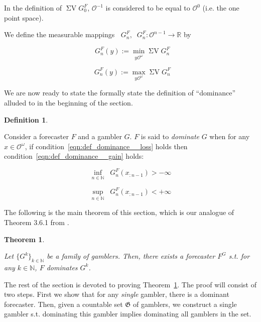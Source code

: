 \documentclass[11pt]{article}
\theoremstyle{definition}
\newtheorem{definition}{Definition}%
\theoremstyle{plain}
\newtheorem{theorem}{Theorem}%
\newcommand{\Nats}{\mathbb{N}}
\newcommand{\Reals}{\mathbb{R}}
\newcommand{\Sq}[2]{\{#1\}_{#2 \in \Nats}}
\newcommand{\Ob}{\mathcal{O}}
\newcommand{\OO}{\Ob^\omega}
\newcommand{\GC}{\mathfrak{G}}
\DeclareMathOperator{\SV}{\Sigma V}
\DeclareMathOperator{\SVM}{\Sigma V_{\min}}
\DeclareMathOperator{\SVX}{\Sigma V_{\max}}
\begin{document}
In the definition of $\SV G^F_0$, $\Ob^{-1}$ is considered to be equal to $\Ob^0$ (i.e. the one point space).

We define the measurable mappings $\SVM G^F_n, \SVX G^F_n: \Ob^{n-1} \rightarrow \Reals$ by

\begin{equation}
\SVM G^F_n\left(y\right):=\min_{y\OO} \SV G^F_n
\end{equation}

\begin{equation}
\SVX G^F_n\left(y\right):=\max_{y\OO} \SV G^F_n
\end{equation}

We are now ready to state the formally state the definition of \enquote{dominance} alluded to in the beginning of the section.

\begin{definition}
\label{def:dominance}

Consider a forecaster $F$ and a gambler $G$. $F$ is said to \emph{dominate} $G$ when for any $x \in \OO$, if condition~\ref{eqn:def_dominance__loss} holds then condition~\ref{eqn:def_dominance__gain} holds:

\begin{equation}
\label{eqn:def_dominance__loss}
\inf_{n \in \Nats} {\SVM G^F_{n}\left(x_{:n-1}\right)} > -\infty
\end{equation}

\begin{equation}
\label{eqn:def_dominance__gain}
\sup_{n \in \Nats} {\SVX G^F_{n}\left(x_{:n-1}\right)} < +\infty
\end{equation}

\end{definition}

The following is the main theorem of this section, which is our analogue of Theorem 3.6.1 from \cite{Garrabrant_2016}.

\begin{theorem}
\label{thm:exist_dominant}

Let $\Sq{G^k}{k}$ be a family of gamblers. Then, there exists a forecaster $F^G$ s.t. for any $k \in \Nats$, $F$ dominates $G^k$.

\end{theorem}

The rest of the section is devoted to proving Theorem~\ref{thm:exist_dominant}. The proof will consist of two steps. First we show that for any \emph{single} gambler, there is a dominant forecaster. Then, given a countable set $\GC$ of gamblers, we construct a single gambler s.t. dominating this gambler implies dominating all gamblers in the set.
\end{document}
